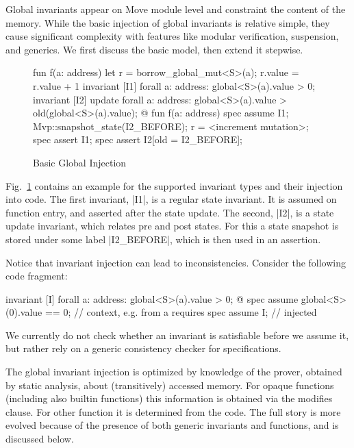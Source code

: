 \label{sec:GlobalInvariants}

Global invariants appear on Move module level and constraint the content of the
memory. While the basic injection of global invariants is relative simple, they
cause significant complexity with features like modular verification, suspension,
and generics. We first discuss the basic model, then extend it stepwise.


\begin{figure}[t!]
  \caption{Basic Global Injection}
  \label{fig:GlobalInvariants}
  \centering
\begin{MoveBox}
  fun f(a: address) {
    let r = borrow_global_mut<S>(a);
    r.value = r.value + 1
  }
  invariant [I1] forall a: address: global<S>(a).value > 0;
  invariant [I2] update
      forall a: address: global<S>(a).value > old(global<S>(a).value);
  @\transform@
  fun f(a: address) {
    spec assume I1;
    Mvp::snapshot_state(I2_BEFORE);
    r = <increment mutation>;
    spec assert I1;
    spec assert I2[old = I2_BEFORE];
  }
\end{MoveBox}
\end{figure}

Fig.~\ref{fig:GlobalInvariants} contains an example for the supported invariant
types and their injection into code. The first invariant, |I1|, is a regular
state invariant. It is assumed on function entry, and asserted after the state
update. The second, |I2|, is a state update invariant, which relates pre and
post states. For this a state snapshot is stored under some label |I2_BEFORE|,
which is then used in an assertion.

Notice that invariant injection can lead to inconsistencies. Consider the following
code fragment:

\begin{Move}
  invariant [I] forall a: address: global<S>(a).value > 0;
  @\transform@
  spec assume global<S>(0).value == 0;  // context, e.g. from a requires
  spec assume I;                        // injected
\end{Move}

\noindent We currently do not check whether an invariant is satisfiable
before we assume it, but rather rely on a generic consistency checker for
specifications.

The global invariant injection is optimized by knowledge of the prover, obtained
by static analysis, about (transitively) accessed memory. For opaque functions
(including also builtin functions) this information is obtained via the modifies
clause. For other function it is determined from the code. The full story is
more evolved because of the presence of both generic invariants and functions,
and is discussed below.

